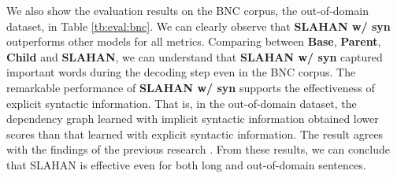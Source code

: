 \documentclass[letterpaper]{article} \usepackage{aaai20}  \usepackage{times}  \usepackage{helvet} \usepackage{courier}  \usepackage[hyphens]{url}  \usepackage{graphicx} \urlstyle{rm} \def\UrlFont{\rm}  \usepackage{graphicx}  \frenchspacing  \setlength{\pdfpagewidth}{8.5in}  \setlength{\pdfpageheight}{11in}  \usepackage{tabu}
\begin{document}
We also show the evaluation results on the BNC corpus, the out-of-domain dataset, in Table \ref{tb:eval:bnc}.
We can clearly observe that \textbf{SLAHAN w/ syn} outperforms other models for all metrics.
Comparing between \textbf{Base}, \textbf{Parent}, \textbf{Child} and \textbf{SLAHAN}, we can understand that \textbf{SLAHAN w/ syn} captured important words during the decoding step even in the BNC corpus.
The remarkable performance of \textbf{SLAHAN w/ syn} supports the effectiveness of explicit syntactic information.
That is, in the out-of-domain dataset, the dependency graph learned with
implicit syntactic information obtained lower scores than
that learned with explicit syntactic information.
The result agrees with the findings of the previous research \cite{wang-EtAl:2017:Long4}.
From these results, we can conclude that SLAHAN is effective even for both long and out-of-domain sentences.
\end{document}
